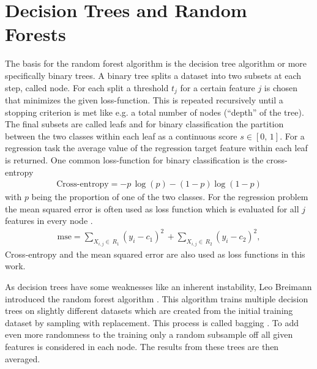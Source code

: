 \section{Decision Trees and Random Forests}
The basis for the random forest algorithm is the decision tree algorithm \cite{breiman1984classification} or more specifically binary trees.
A binary tree splits a dataset into two subsets at each step, called node.
For each split a threshold $t_j$ for a certain feature $j$ is chosen that minimizes the given loss-function.
This is repeated recursively until a stopping criterion is met like e.g. a total number of nodes (\enquote{depth} of the tree). 
The final subsets are called leafs and for binary classification the partition between the two classes within each leaf as a continuous score $s \in [0,\, 1]$.
For a regression task the average value of the regression target feature within each leaf is returned.
One common loss-function for binary classification is the cross-entropy
\begin{align}
    \text{Cross-entropy} = - p\, \log(p) - (1 - p) \log(1-p)
\end{align}
with $p$ being the proportion of one of the two classes.
For the regression problem the mean squared error is often used as loss function which is evaluated for all $j$ features in every node \cite{hastie2009elements}.
\begin{align}
    \text{mse} = \sum_{X_{i,j} \in\, R_1} (y_i - c_1)^2\, + \sum_{X_{i,j} \in\, R_2} (y_i - c_2)^2,
\end{align}
Cross-entropy and the mean squared error are also used as loss functions in this work.

As decision trees have some weaknesses like an inherent instability, Leo Breimann introduced the random forest algorithm \cite{breiman2001random}. 
This algorithm trains multiple decision trees on slightly different datasets which are created from the initial training dataset by sampling with replacement.
This process is called bagging \cite{breiman1996bagging}.
To add even more randomness to the training only a random subsample off all given features is considered in each node. 
The results from these trees are then averaged.


